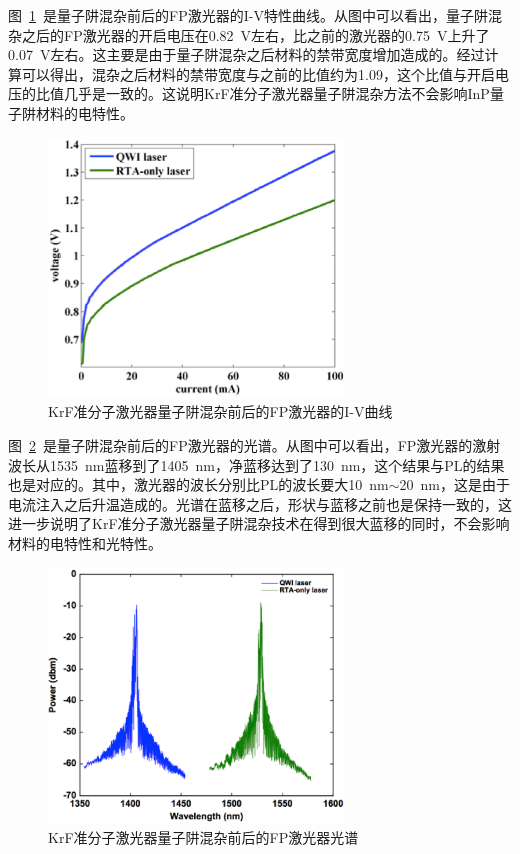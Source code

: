\documentclass{ZJUthesis}
\begin{document}
图~\ref{fig_fp_iv}~是量子阱混杂前后的FP激光器的I-V特性曲线。从图中可以看出，量子阱混杂之后的FP激光器的开启电压在0.82~V左右，比之前的激光器的0.75~V上升了0.07~V左右。这主要是由于量子阱混杂之后材料的禁带宽度增加造成的。经过计算可以得出，混杂之后材料的禁带宽度与之前的比值约为1.09，这个比值与开启电压的比值几乎是一致的。这说明KrF准分子激光器量子阱混杂方法不会影响InP量子阱材料的电特性。

\begin{figure}[htbp]
    \centering
    \includegraphics[width=0.7\textwidth]{./Pictures/fp_iv.eps}
    \caption{KrF准分子激光器量子阱混杂前后的FP激光器的I-V曲线}
    \label{fig_fp_iv}
\end{figure}

图~\ref{fig_fp_spectra}~是量子阱混杂前后的FP激光器的光谱。从图中可以看出，FP激光器的激射波长从1535~nm蓝移到了1405~nm，净蓝移达到了130~nm，这个结果与PL的结果也是对应的。其中，激光器的波长分别比PL的波长要大10~nm$\sim$20~nm，这是由于电流注入之后升温造成的。光谱在蓝移之后，形状与蓝移之前也是保持一致的，这进一步说明了KrF准分子激光器量子阱混杂技术在得到很大蓝移的同时，不会影响材料的电特性和光特性。

\begin{figure}[htbp]
    \centering
    \includegraphics[width=0.7\textwidth]{./Pictures/fp_spectra.eps}
    \caption{KrF准分子激光器量子阱混杂前后的FP激光器光谱}
    \label{fig_fp_spectra}
\end{figure}
\end{document}
